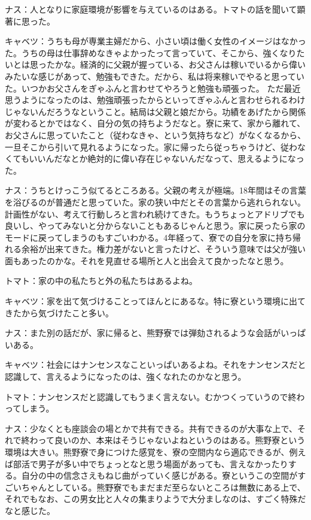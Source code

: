 ナス：人となりに家庭環境が影響を与えているのはある。トマトの話を聞いて顕著に思った。

キャベツ：うちも母が専業主婦だから、小さい頃は働く女性のイメージはなかった。うちの母は仕事辞めなきゃよかったって言っていて、そこから、強くなりたいとは思ったかな。経済的に父親が握っている、お父さんは稼いでいるから偉いみたいな感じがあって、勉強もできた。だから、私は将来稼いでやると思っていた。いつかお父さんをぎゃふんと言わせてやろうと勉強も頑張った。
ただ最近思うようになったのは、勉強頑張ったからといってぎゃふんと言わせられるわけじゃないんだろうなということ。結局は父親と娘だから。功績をあげたから関係が変わるとかではなく、自分の気の持ちようだなと。寮に来て、家から離れて、お父さんに思っていたこと（従わなきゃ、という気持ちなど）がなくなるから、一旦そこから引いて見れるようになった。家に帰ったら従っちゃうけど、従わなくてもいいんだなとか絶対的に偉い存在じゃないんだなって、思えるようになった。

ナス：うちとけっこう似てるところある。父親の考えが極端。18年間はその言葉を浴びるのが普通だと思っていた。家の狭い中だとその言葉から逃れられない。計画性がない、考えて行動しろと言われ続けてきた。もうちょっとアドリブでも良いし、やってみないと分からないこともあるじゃんと思う。家に戻ったら家のモードに戻ってしまうのもすごいわかる。4年経って、寮での自分を家に持ち帰れる余裕が出来てきた。権力差がないと言ったけど、そういう意味では父が強い面もあったのかな。それを見直せる場所と人と出会えて良かったなと思う。

トマト：家の中の私たちと外の私たちはあるよね。

キャベツ：家を出て気づけることってほんとにあるな。特に寮という環境に出てきたから気づけたこと多い。

ナス：また別の話だが、家に帰ると、熊野寮では弾劾されるような会話がいっぱいある。

キャベツ：社会にはナンセンスなこといっぱいあるよね。それをナンセンスだと認識して、言えるようになったのは、強くなれたのかなと思う。

トマト：ナンセンスだと認識してもうまく言えない。むかつくっていうので終わってしまう。

ナス：少なくとも座談会の場とかで共有できる。共有できるのが大事な上で、それで終わって良いのか、本来はそうじゃないよねというのはある。熊野寮という環境は大きい。熊野寮で身につけた感覚を、寮の空間内なら適応できるが、例えば部活で男子が多い中でちょっとなと思う場面があっても、言えなかったりする。自分の中の信念さえもねじ曲がっていく感じがある。寮というこの空間がすごいちゃんとしている。熊野寮でもまだまだ至らないところは無数にある上で、それでもなお、この男女比と人々の集まりようで大分ましなのは、すごく特殊だなと感じた。

